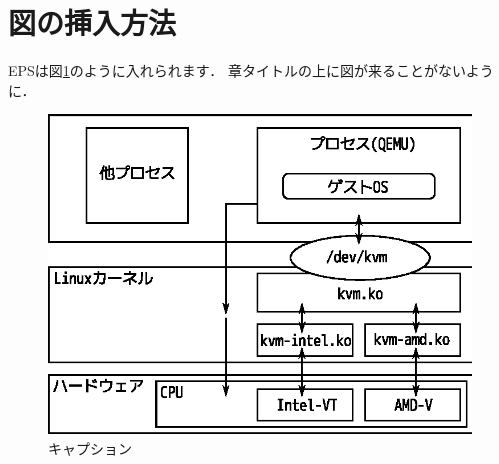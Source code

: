 ﻿\section{図の挿入方法}
EPSは図\ref{fig:eps}のように入れられます．
章タイトルの上に図が来ることがないように．

\begin{figure}[hb]
    \centering
    \includegraphics[width=\columnwidth,keepaspectratio]{fig/kvm-and-qemu-arch.eps}
    \caption{キャプション}
    \label{fig:eps}
\end{figure}
